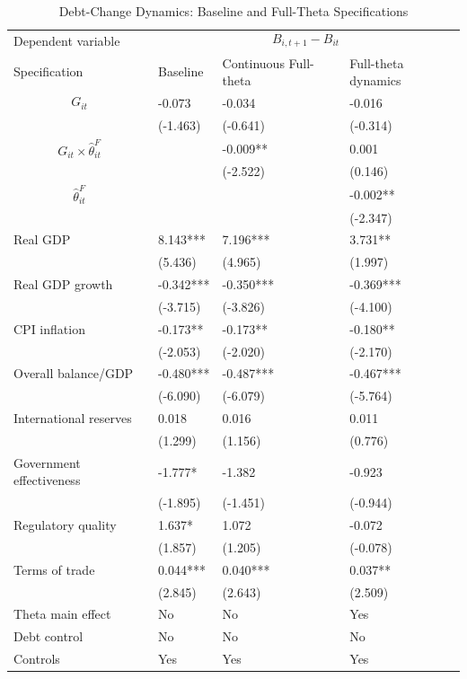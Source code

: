 \begin{table}[H]\centering
\begin{threeparttable}
\caption{Debt-Change Dynamics: Baseline and Full-Theta Specifications}
\label{tab:debt_change_combined_fulltheta}
\scriptsize
\begin{tabularx}{\textwidth}{lYYY}
\toprule
Dependent variable &  \\
\cmidrule(lr){2-4}
Specification & Baseline & Continuous Full-theta & Full-theta dynamics \\
\midrule
$$G_{it}$$ & -0.073 & -0.034 & -0.016 \\
 & (-1.463) & (-0.641) & (-0.314) \\
$$G_{it}\times\widehat{\theta}^{F}_{it}$$ &  & -0.009** & 0.001 \\
 &  & (-2.522) & (0.146) \\
$$\widehat{\theta}^{F}_{it}$$ &  &  & -0.002** \\
 &  &  & (-2.347) \\
Real GDP & 8.143*** & 7.196*** & 3.731** \\
 & (5.436) & (4.965) & (1.997) \\
Real GDP growth & -0.342*** & -0.350*** & -0.369*** \\
 & (-3.715) & (-3.826) & (-4.100) \\
CPI inflation & -0.173** & -0.173** & -0.180** \\
 & (-2.053) & (-2.020) & (-2.170) \\
Overall balance/GDP & -0.480*** & -0.487*** & -0.467*** \\
 & (-6.090) & (-6.079) & (-5.764) \\
International reserves & 0.018 & 0.016 & 0.011 \\
 & (1.299) & (1.156) & (0.776) \\
Government effectiveness & -1.777* & -1.382 & -0.923 \\
 & (-1.895) & (-1.451) & (-0.944) \\
Regulatory quality & 1.637* & 1.072 & -0.072 \\
 & (1.857) & (1.205) & (-0.078) \\
Terms of trade & 0.044*** & 0.040*** & 0.037** \\
 & (2.845) & (2.643) & (2.509) \\
\midrule
Theta main effect & No & No & Yes \\
Debt control & No & No & No \\
Controls & Yes & Yes & Yes \\

\end{tabularx}
\end{threeparttable}
\end{table}
